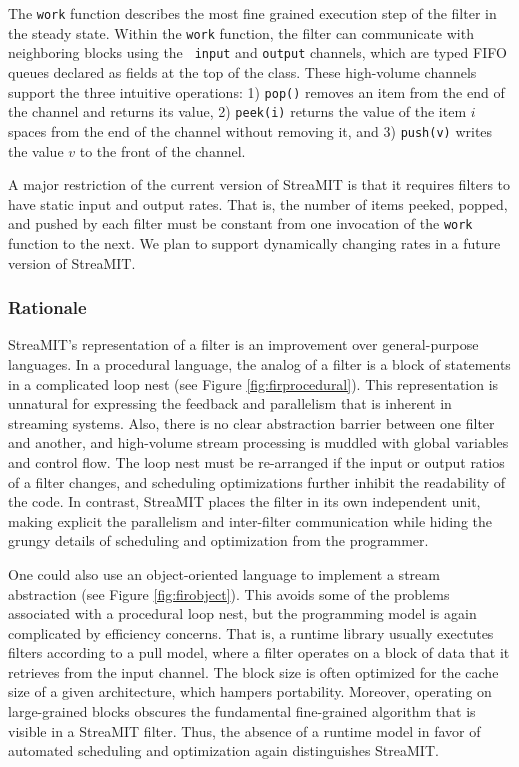 The {\tt work} function describes the most fine grained execution step
of the filter in the steady state.  Within the {\tt work} function,
the filter can communicate with neighboring blocks using the {\tt
input} and {\tt output} channels, which are typed FIFO queues declared
as fields at the top of the class.  These high-volume channels support
the three intuitive operations: 1) {\tt pop()} removes an item from
the end of the channel and returns its value, 2) {\tt peek(i)} returns
the value of the item $i$ spaces from the end of the channel without
removing it, and 3) {\tt push(v)} writes the value $v$ to the front of
the channel.

A major restriction of the current version of StreaMIT is that it
requires filters to have static input and output rates.  That is, the
number of items peeked, popped, and pushed by each filter must be
constant from one invocation of the {\tt work} function to the next.
We plan to support dynamically changing rates in a future version of
StreaMIT.

\subsubsection{Rationale}

StreaMIT's representation of a filter is an improvement over
general-purpose languages.  In a procedural language, the analog of a
filter is a block of statements in a complicated loop nest (see Figure
\ref{fig:firprocedural}).  This representation is unnatural for expressing
the feedback and parallelism that is inherent in streaming systems.
Also, there is no clear abstraction barrier between one filter and
another, and high-volume stream processing is muddled with global
variables and control flow.  The loop nest must be re-arranged if the
input or output ratios of a filter changes, and scheduling
optimizations further inhibit the readability of the code.  In
contrast, StreaMIT places the filter in its own independent unit,
making explicit the parallelism and inter-filter communication while
hiding the grungy details of scheduling and optimization from the
programmer.

One could also use an object-oriented language to implement a stream
abstraction (see Figure \ref{fig:firobject}).  This avoids some of the
problems associated with a procedural loop nest, but the programming
model is again complicated by efficiency concerns.  That is, a runtime
library usually exectutes filters according to a pull model, where a
filter operates on a block of data that it retrieves from the input
channel.  The block size is often optimized for the cache size of a
given architecture, which hampers portability.  Moreover, operating on
large-grained blocks obscures the fundamental fine-grained algorithm
that is visible in a StreaMIT filter.  Thus, the absence of a runtime
model in favor of automated scheduling and optimization again
distinguishes StreaMIT.

